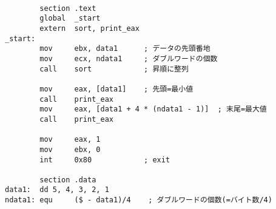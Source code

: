 \documentclass[a4j]{jarticle}
\begin{document}
\begin{lstlisting}[caption=test\_sort.s]
  
        section .text
        global  _start
        extern  sort, print_eax
_start:
        mov     ebx, data1      ; データの先頭番地
        mov     ecx, ndata1     ; ダブルワードの個数
        call    sort            ; 昇順に整列

        mov     eax, [data1]    ; 先頭=最小値
        call    print_eax
        mov     eax, [data1 + 4 * (ndata1 - 1)]  ; 末尾=最大値
        call    print_eax

        mov     eax, 1
        mov     ebx, 0
        int     0x80            ; exit

        section .data
data1:  dd 5, 4, 3, 2, 1
ndata1: equ     ($ - data1)/4    ; ダブルワードの個数(=バイト数/4)
\end{lstlisting}
\end{document}
